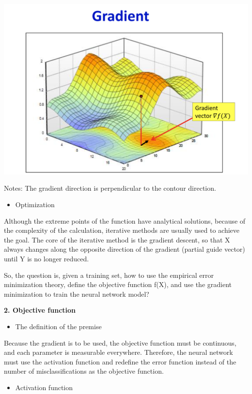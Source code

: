 \documentclass{article}
\begin{document}
	
	\includegraphics[scale=0.2]{58.png}
	
	Notes: The gradient direction is perpendicular to the contour direction.
	
	
	\begin{itemize}
		\item Optimization
	\end{itemize}
	
	Although the extreme points of the function have analytical solutions, because of the complexity of the calculation, iterative methods are usually used to achieve the goal. The core of the iterative method is the gradient descent, so that X always changes along the opposite direction of the gradient (partial guide vector) until Y is no longer reduced.
	
	So, the question is, given a training set, how to use the empirical error minimization theory, define the objective function f(X), and use the gradient minimization to train the neural network model?
	
	
	\textbf{2. Objective function}
	
	\begin{itemize}
		\item The definition of the premise
	\end{itemize}
	
	Because the gradient is to be used, the objective function must be continuous, and each parameter is measurable everywhere. Therefore, the neural network must use the activation function and redefine the error function instead of the number of misclassifications as the objective function.
	
	\begin{itemize}
		\item Activation function
	\end{itemize}
\end{document}
